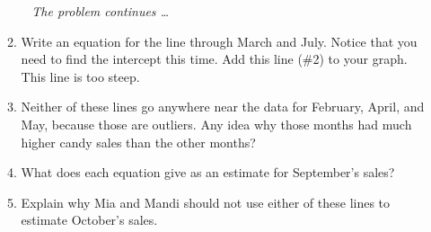 \begin{enumerate}
\begin{enumerate}
\newpage %
~\hspace{-.5in} \emph{The problem continues \ldots}

\item Write an equation for the line through March and July.  Notice that you need to find the intercept this time.  Add this line (\#2) to your graph.  This line is too steep. \vfill \vfill \vfill
\item Neither of these lines go anywhere near the data for February, April, and May, because those are outliers.  Any idea why those months had much higher candy sales than the other months? \vfill
\item What does each equation give as an estimate for September's sales?  \vfill
\item Explain why Mia and Mandi should not use either of these lines to estimate October's sales. \vfill
\end{enumerate}

\end{enumerate}




%
% 

% 

